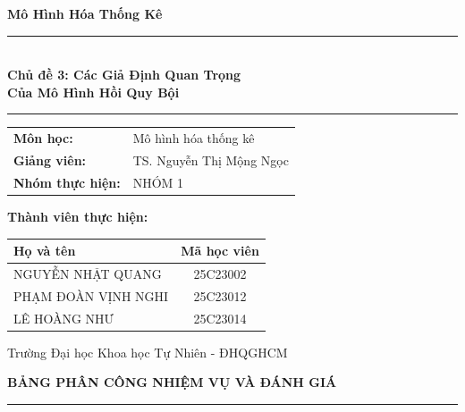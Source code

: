 \documentclass[12pt, a4paper]{article}
\begin{document}
\begin{titlepage}
  \centering
  \vspace*{1.5cm}

  {\Large\bfseries Mô Hình Hóa Thống Kê}\\[0.5cm]
  {\rule{\linewidth}{1.5pt}}\\[0.3cm]

  {\Huge\bfseries
    Chủ đề 3: Các Giả Định Quan Trọng \\[0.3cm]
    Của Mô Hình Hồi Quy Bội}\\[0.3cm]
  {\rule{\linewidth}{1.5pt}}

  \vspace{2.5cm}

  {\large
  \renewcommand{\arraystretch}{1.5}
  \begin{tabular}{ll}
    \textbf{Môn học:} & Mô hình hóa thống kê \\
    \textbf{Giảng viên:} & TS. Nguyễn Thị Mộng Ngọc \\
    \textbf{Nhóm thực hiện:} & NHÓM 1
  \end{tabular}
  }

  \vfill
  \textbf{Thành viên thực hiện:} \\[0.4cm]
  \renewcommand{\arraystretch}{1.3}
  \begin{tabular}{l c}
    \toprule
    \textbf{Họ và tên} & \textbf{Mã học viên} \\
    \midrule
    NGUYỄN NHẬT QUANG & 25C23002 \\
    PHẠM ĐOÀN VỊNH NGHI & 25C23012 \\
    LÊ HOÀNG NHƯ & 25C23014 \\
    \bottomrule
  \end{tabular}

  \vfill
  {\small Trường Đại học Khoa học Tự Nhiên - ĐHQGHCM}
\end{titlepage}

\newpage
\begin{center}
  {\Large\bfseries BẢNG PHÂN CÔNG NHIỆM VỤ VÀ ĐÁNH GIÁ}\\[0.3cm]
  {\rule{\linewidth}{1pt}}
\end{center}

\vspace{0.5cm}
\end{document}
